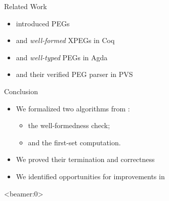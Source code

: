 \documentclass{beamer}
\begin{document}
%
%
%

\begin{frame}{Related Work}
    \begin{itemize}
        \item \cite{ford_parsing_2004} introduced PEGs
        \item \cite{koprowski_trx_2011} and \emph{well-formed} XPEGs in Coq
        \item \cite{ribeiro_towards_2019} and \emph{well-typed} PEGs in Agda
        \item \cite{blaudeau_verified_2020} and their verified PEG parser in PVS
    \end{itemize}
\end{frame}

\begin{frame}{Conclusion}
    \begin{itemize}
        \item We formalized two algorithms from \lpeg{}:
        \begin{itemize}
            \item the well-formedness check;
            \item and the first-set computation.
        \end{itemize}
        \item We proved their termination and correctness
        \item We identified opportunities for improvements in \lpeg{}
    \end{itemize}
\end{frame}

\begin{frame}<beamer:0>
    
    
\end{frame}
\end{document}
